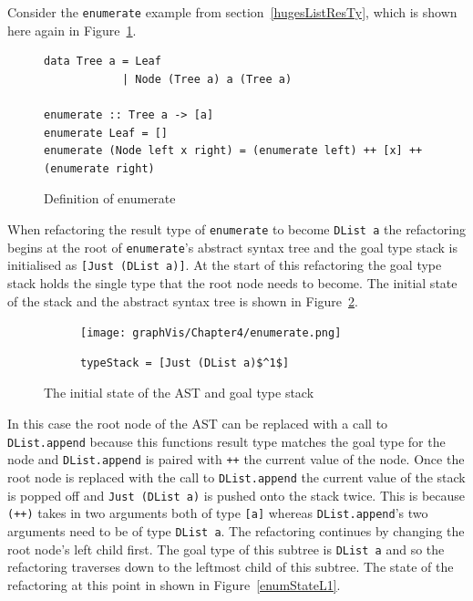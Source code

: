 Consider the \texttt{enumerate} example from section~\ref{hugesListResTy}, which is shown here again in Figure~\ref{enumerate2}.

\begin{figure}[t]
\begin{lstlisting}
data Tree a = Leaf
            | Node (Tree a) a (Tree a)

enumerate :: Tree a -> [a]
enumerate Leaf = []
enumerate (Node left x right) = (enumerate left) ++ [x] ++ (enumerate right)

\end{lstlisting}
\caption{Definition of enumerate}
\label{enumerate2}
\end{figure}

When refactoring the result type of \texttt{enumerate} to become \texttt{DList a} the refactoring begins at the root of \texttt{enumerate}'s abstract syntax tree and the goal type stack is initialised as \texttt{[Just (DList a)]}. At the start of this refactoring the goal type stack holds the single type that the root node needs to become. The initial state of the stack and the abstract syntax tree is shown in Figure~\ref{initASTStack}.

\begin{figure}[t]
	\begin{subfigure}{\linewidth}
		\texttt{[image: graphVis/Chapter4/enumerate.png]}
	\end{subfigure}\par\medskip

	\begin{subfigure}{\linewidth}
		\begin{lstlisting}[mathescape]
			typeStack = [Just (DList a)$^1$]
		\end{lstlisting}
	\end{subfigure}\par\medskip
\caption{The initial state of the AST and goal type stack}
\label{initASTStack}
\end{figure} 

In this case the root node of the AST can be replaced with a call to \texttt{DList.append} because this functions result type matches the goal type for the node and \texttt{DList.append} is paired with \texttt{++} the current value of the node. Once the root node is replaced with the call to \texttt{DList.append} the current value of the stack is popped off and \texttt{Just (DList a)} is pushed onto the stack twice. This is because \texttt{(++)} takes in two arguments both of type \texttt{[a]} whereas \texttt{DList.append}'s two arguments need to be of type \texttt{DList a}. The refactoring continues by changing the root node's left child first. The goal type of this subtree is \texttt{DList a} and so the refactoring traverses down to the leftmost child of this subtree. The state of the refactoring at this point in shown in Figure~\ref{enumStateL1}.

